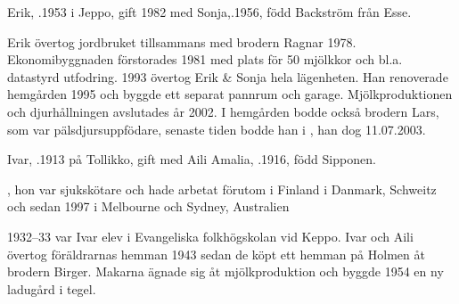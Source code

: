 
Erik, .1953 i Jeppo, gift 1982 med Sonja,.1956, född Backström från Esse.
\begin{jhchildren}
  \item {}
  \item {}
  \item {}
  \item {}
  \item {}
  \item {}
  \item {}
\end{jhchildren}

Erik övertog jordbruket tillsammans med brodern Ragnar 1978. 	Ekonomibyggnaden förstorades 1981 med plats för 50 mjölkkor och bl.a. datastyrd utfodring. 1993 övertog Erik \& Sonja hela lägenheten. Han renoverade hemgården 1995 och byggde ett separat pannrum och garage. Mjölkproduktionen och djurhållningen avslutades år 2002. I hemgården bodde också brodern Lars, som var pälsdjursuppfödare, senaste tiden bodde han i , han dog 11.07.2003.


Ivar, .1913 på Tollikko, gift med Aili Amalia, .1916, född Sipponen.
\begin{jhchildren}
  \item {}, hon var sjukskötare och hade arbetat förutom i Finland i Danmark, Schweitz och sedan 1997 i Melbourne och Sydney, Australien
  \item {}
  \item {}
  \item {}
  \item {}
\end{jhchildren}
1932--33 var Ivar elev i Evangeliska folkhögskolan vid Keppo. Ivar och Aili övertog föräldrarnas hemman 1943 sedan de köpt ett hemman på Holmen åt brodern Birger. Makarna ägnade sig åt mjölkproduktion och byggde 1954 en ny ladugård i tegel.


